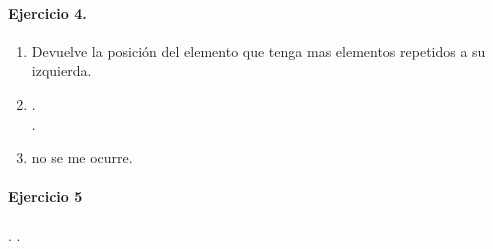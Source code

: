 \documentclass{article}
\begin{document}
\paragraph{Ejercicio 4.}
\begin{enumerate}[label=\alph*)]
\item Devuelve la posición del elemento que tenga mas elementos repetidos a su izquierda.
\item .\\ .
\item no se me ocurre.
\end{enumerate}
\paragraph{Ejercicio 5}.
.
\end{document}
